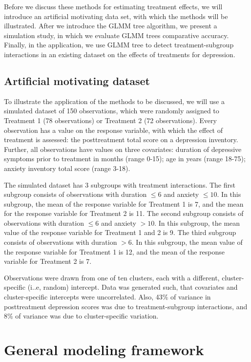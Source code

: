 \documentclass[nobf,doc]{apa}
\begin{document}
Before we discuss these methods for estimating treatment effects, we will introduce an artificial motivating data set, with which the methods will be illustrated. After we introduce the GLMM tree algorithm, we present a simulation study, in which we evaluate GLMM trees comparative accuracy. Finally, in the application, we use GLMM tree to detect treatment-subgroup interactions in an existing dataset on the effects of treatments for depression.  

\subsection{Artificial motivating dataset} 

To illustrate the application of the methods to be discussed, we will use a simulated dataset of 150 observations, which were randomly assigned to Treatment 1 (78 observations) or Treatment 2 (72 observations). Every observation has a value on the response variable, with which the effect of treatment is assessed: the posttreatment total score on a depression inventory. Further, all observations have values on three covariates: duration of depressive symptoms prior to treatment in months (range 0-15); age in years (range 18-75); anxiety inventory total score (range 3-18). 

The simulated dataset has 3 subgroups with treatment interactions. The first subgroup consists of observations with duration $\leq 6$ and anxiety $\leq 10$. In this subgroup, the mean of the response variable for Treatment 1 is 7, and the mean for the response variable for Treatment 2 is 11. The second subgroup consists of observations with duration $\leq 6$ and anxiety $> 10$. In this subgroup, the mean value of the response variable for Treatment 1 and 2 is 9. The third subgroup consists of observations with duration $>6$. In this subgroup, the mean value of the response variable for Treatment 1 is 12, and the mean of the response variable for Treatment 2 is 7. 

Observations were drawn from one of ten clusters, each with a different, cluster-specific (i..e, random) intercept. Data was generated such, that covariates and cluster-specific intercepts were uncorrelated. Also, 43\% of variance in posttreatment depression scores was due to treatment-subgroup interactions, and 8\% of variance was due to cluster-specific variation. 




\section{General modeling framework}
\end{document}
